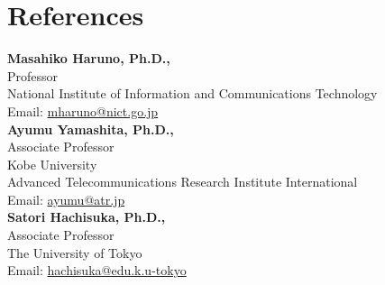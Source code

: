 \documentclass[letterpaper,10.5pt]{article}
\begin{document}
\section*{References}
\textbf{Masahiko Haruno, Ph.D.,} \\ 
Professor \\ 
National Institute of Information and Communications Technology \\ 
Email: \href{mailto:mharuno@nict.go.jp}{mharuno@nict.go.jp}\vspace{5pt} \\ 
\textbf{Ayumu Yamashita, Ph.D.,} \\ 
Associate Professor \\ 
Kobe University \\ 
Advanced Telecommunications Research Institute International \\ 
Email: \href{mailto:ayumu@atr.jp}{ayumu@atr.jp}\vspace{5pt} \\ 
\textbf{Satori Hachisuka, Ph.D.,} \\ 
Associate Professor \\ 
The University of Tokyo \\ 
Email: \href{mailto:hachisuka@edu.k.u-tokyo}{hachisuka@edu.k.u-tokyo}\vspace{5pt} \\ 
\end{document}
